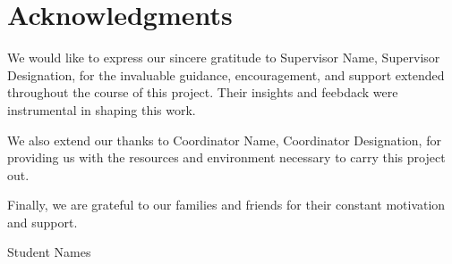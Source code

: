 \chapter*{Acknowledgments}

We would like to express our sincere gratitude to {Supervisor Name}, {Supervisor Designation}, for the invaluable guidance, encouragement, and support extended throughout the course of this project. Their insights and feebdack were instrumental in shaping this work.

We also extend our thanks to {Coordinator Name}, {Coordinator Designation}, for providing us with the resources and environment necessary to carry this project out.

Finally, we are grateful to our families and friends for their constant motivation and support.

{Student Names}
